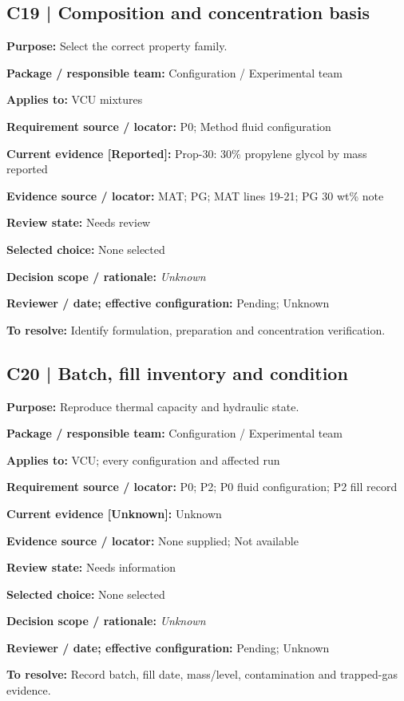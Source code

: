 \documentclass[11pt]{article}
\begin{document}
\par\noindent\begin{minipage}{\textwidth}\small\setlength{\parskip}{2pt}
\subsection*{C19 | Composition and concentration basis}
\textbf{Purpose:} Select the correct property family.\par
\textbf{Package / responsible team:} Configuration / Experimental team\par
\textbf{Applies to:} VCU mixtures\par
\textbf{Requirement source / locator:} P0; Method fluid configuration\par
\textbf{Current evidence [Reported]:} Prop-30: 30\% propylene glycol by mass reported\par
\textbf{Evidence source / locator:} MAT; PG; MAT lines 19-21; PG 30 wt\% note\par
\textbf{Review state:} Needs review\par
\textbf{Selected choice:} None selected\par
\textbf{Decision scope / rationale:} \textit{Unknown}\par
\textbf{Reviewer / date; effective configuration:} Pending; Unknown\par
\textbf{To resolve:} Identify formulation, preparation and concentration verification.\par
\end{minipage}\par\vspace{5pt}
\par\noindent\begin{minipage}{\textwidth}\small\setlength{\parskip}{2pt}
\subsection*{C20 | Batch, fill inventory and condition}
\textbf{Purpose:} Reproduce thermal capacity and hydraulic state.\par
\textbf{Package / responsible team:} Configuration / Experimental team\par
\textbf{Applies to:} VCU; every configuration and affected run\par
\textbf{Requirement source / locator:} P0; P2; P0 fluid configuration; P2 fill record\par
\textbf{Current evidence [Unknown]:} Unknown\par
\textbf{Evidence source / locator:} None supplied; Not available\par
\textbf{Review state:} Needs information\par
\textbf{Selected choice:} None selected\par
\textbf{Decision scope / rationale:} \textit{Unknown}\par
\textbf{Reviewer / date; effective configuration:} Pending; Unknown\par
\textbf{To resolve:} Record batch, fill date, mass/level, contamination and trapped-gas evidence.\par
\end{minipage}\par\vspace{5pt}
\end{document}
